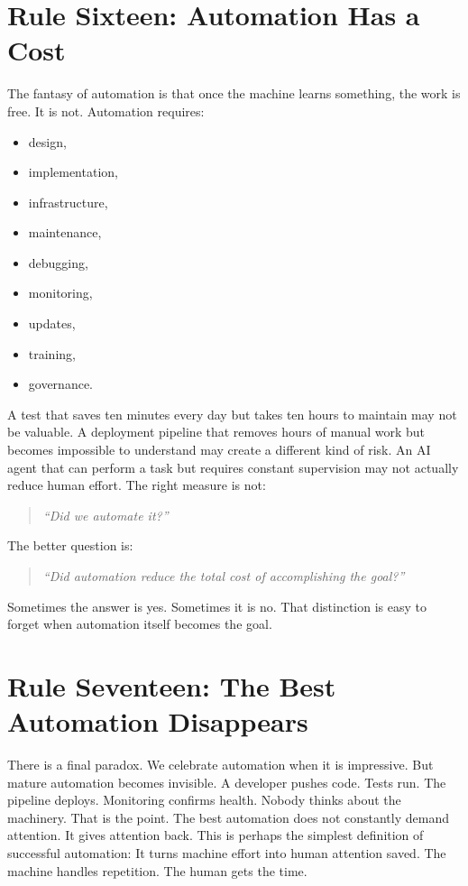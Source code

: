 \documentclass[11pt,twoside]{book}
\begin{document}
\section*{Rule Sixteen: Automation Has a Cost}

The fantasy of automation is that once the machine learns something, the work is free.
It is not.
Automation requires:
\begin{itemize}[nosep]
    \item design,
    \item implementation,
    \item infrastructure,
    \item maintenance,
    \item debugging,
    \item monitoring,
    \item updates,
    \item training,
    \item governance.
\end{itemize}
A test that saves ten minutes every day but takes ten hours to maintain may not be valuable.
A deployment pipeline that removes hours of manual work but becomes impossible to understand may create a different kind of risk.
An AI agent that can perform a task but requires constant supervision may not actually reduce human effort.
The right measure is not:
\begin{quote}
\emph{``Did we automate it?''}
\end{quote}
The better question is:
\begin{quote}
\emph{``Did automation reduce the total cost of accomplishing the goal?''}
\end{quote}
Sometimes the answer is yes.
Sometimes it is no.
That distinction is easy to forget when automation itself becomes the goal.

\section*{Rule Seventeen: The Best Automation Disappears}

There is a final paradox.
We celebrate automation when it is impressive.
But mature automation becomes invisible.
A developer pushes code.
Tests run.
The pipeline deploys.
Monitoring confirms health.
Nobody thinks about the machinery.
That is the point.
The best automation does not constantly demand attention.
It gives attention back.
This is perhaps the simplest definition of successful automation:
It turns machine effort into human attention saved.
The machine handles repetition.
The human gets the time.
\end{document}
